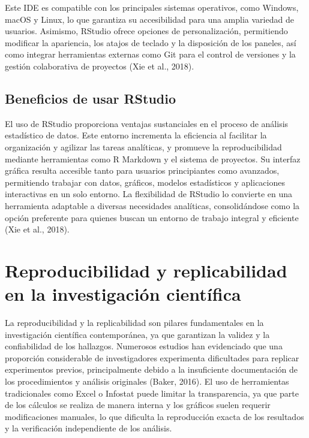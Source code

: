 \documentclass[
  spanish,
  a4paper,
  DIV=11,
  numbers=noendperiod,
  onepage,
  openany]{scrreprt}
\begin{document}
Este IDE es compatible con los principales sistemas operativos, como
Windows, macOS y Linux, lo que garantiza su accesibilidad para una
amplia variedad de usuarios. Asimismo, RStudio ofrece opciones de
personalización, permitiendo modificar la apariencia, los atajos de
teclado y la disposición de los paneles, así como integrar herramientas
externas como Git para el control de versiones y la gestión colaborativa
de proyectos (Xie et al., 2018).

\subsection{Beneficios de usar
RStudio}\label{beneficios-de-usar-rstudio}

El uso de RStudio proporciona ventajas sustanciales en el proceso de
análisis estadístico de datos. Este entorno incrementa la eficiencia al
facilitar la organización y agilizar las tareas analíticas, y promueve
la reproducibilidad mediante herramientas como R Markdown y el sistema
de proyectos. Su interfaz gráfica resulta accesible tanto para usuarios
principiantes como avanzados, permitiendo trabajar con datos, gráficos,
modelos estadísticos y aplicaciones interactivas en un solo entorno. La
flexibilidad de RStudio lo convierte en una herramienta adaptable a
diversas necesidades analíticas, consolidándose como la opción
preferente para quienes buscan un entorno de trabajo integral y
eficiente (Xie et al., 2018).

\section{Reproducibilidad y replicabilidad en la investigación
científica}\label{reproducibilidad-y-replicabilidad-en-la-investigaciuxf3n-cientuxedfica}

La reproducibilidad y la replicabilidad son pilares fundamentales en la
investigación científica contemporánea, ya que garantizan la validez y
la confiabilidad de los hallazgos. Numerosos estudios han evidenciado
que una proporción considerable de investigadores experimenta
dificultades para replicar experimentos previos, principalmente debido a
la insuficiente documentación de los procedimientos y análisis
originales (Baker, 2016). El uso de herramientas tradicionales como
Excel o Infostat puede limitar la transparencia, ya que parte de los
cálculos se realiza de manera interna y los gráficos suelen requerir
modificaciones manuales, lo que dificulta la reproducción exacta de los
resultados y la verificación independiente de los análisis.
\end{document}
